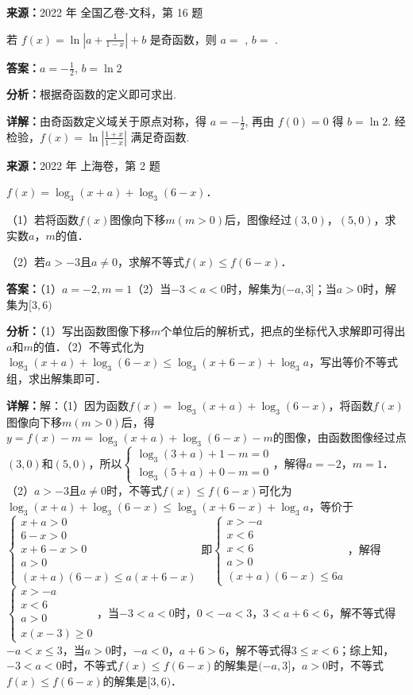 \begin{question}[points=5]
\textbf{来源：}2022 年 全国乙卷-文科，第 16 题\par
若 $f(x) = \ln\left| a + \frac{1}{1-x} \right| + b$ 是奇函数，则 $a=$ , $b=$ .
\fillin[{$a=-\frac12$, $b=\ln2$}]
\begin{solution}
\textbf{答案：}$a=-\frac12$, $b=\ln2$

\textbf{分析：}根据奇函数的定义即可求出.

\textbf{详解：}由奇函数定义域关于原点对称，得 $a=-\frac12$, 再由 $f(0)=0$ 得 $b=\ln2$. 经检验，$f(x)=\ln\left|\frac{1+x}{1-x}\right|$ 满足奇函数.
\end{solution}
\end{question}

\begin{question}[points=14]
\textbf{来源：}2022 年 上海卷，第 2 题\par
$f(x)=\log_3(x+a)+\log_3(6-x)$．

（1）若将函数$f(x)$图像向下移$m(m>0)$后，图像经过$(3,0)$，$(5,0)$，求实数$a$，$m$的值．

（2）若$a>-3$且$a\neq0$，求解不等式$f(x)\leq f(6-x)$．
\begin{solution}
\textbf{答案：}（1）$a=-2,m=1$（2）当$-3<a<0$时，解集为$(-a,3]$；当$a>0$时，解集为$[3,6)$

\textbf{分析：}（1）写出函数图像下移$m$个单位后的解析式，把点的坐标代入求解即可得出$a$和$m$的值．（2）不等式化为$\log_3(x+a)+\log_3(6-x)\leq \log_3(x+6-x)+\log_3 a$，写出等价不等式组，求出解集即可．

\textbf{详解：}解：（1）因为函数$f(x)=\log_3(x+a)+\log_3(6-x)$，将函数$f(x)$图像向下移$m(m>0)$后，得$y=f(x)-m=\log_3(x+a)+\log_3(6-x)-m$的图像，由函数图像经过点$(3,0)$和$(5,0)$，所以$\begin{cases}\log_3(3+a)+1-m=0\\\log_3(5+a)+0-m=0\end{cases}$，解得$a=-2$，$m=1$．（2）$a>-3$且$a\neq0$时，不等式$f(x)\leq f(6-x)$可化为$\log_3(x+a)+\log_3(6-x)\leq \log_3(x+6-x)+\log_3 a$，等价于$\begin{cases}x+a>0\\6-x>0\\x+6-x>0\\a>0\\(x+a)(6-x)\leq a(x+6-x)\end{cases}$即$\begin{cases}x>-a\\x<6\\x<6\\a>0\\(x+a)(6-x)\leq 6a\end{cases}$，解得$\begin{cases}x>-a\\x<6\\a>0\\x(x-3)\geq0\end{cases}$，当$-3<a<0$时，$0<-a<3$，$3<a+6<6$，解不等式得$-a<x\leq 3$，当$a>0$时，$-a<0$，$a+6>6$，解不等式得$3\leq x<6$；综上知，$-3<a<0$时，不等式$f(x)\leq f(6-x)$的解集是$(-a,3]$，$a>0$时，不等式$f(x)\leq f(6-x)$的解集是$[3,6)$．
\end{solution}
\end{question}

